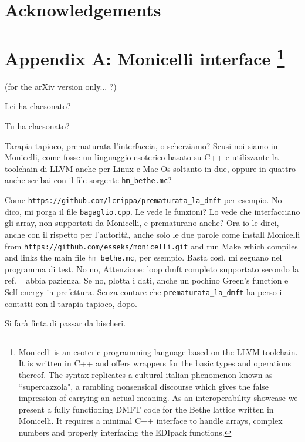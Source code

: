 \documentclass[preprint,3p,10pt]{elsarticle}
\begin{document}

\section*{Acknowledgements}

\section[appA]{Appendix A: Monicelli interface
\footnote{Monicelli is an esoteric programming language based on the LLVM toolchain. It is written in C++ and offers wrappers for the basic types and operations thereof. The syntax replicates a cultural italian phenomenon known as ``supercazzola", a rambling nonsensical discourse which gives the false impression of carrying an actual meaning. As an interoperability showcase we present a fully functioning DMFT code for the Bethe lattice written in Monicelli. It requires a minimal C++ interface to handle arrays, complex numbers and properly interfacing the EDIpack functions. }}

(for the arXiv version only... ?)

Lei ha clacsonato?

Tu ha clacsonato?

Tarapia tapioco, prematurata l'interfaccia, o scherziamo? Scusi noi siamo in Monicelli, come fosse un linguaggio esoterico basato su C++ e utilizzante la toolchain di LLVM anche per Linux e Mac Os soltanto in due, oppure in quattro anche scribai con il file sorgente {\tt hm\_bethe.mc}? 

Come {\tt https://github.com/lcrippa/prematurata\_la\_dmft} per esempio. No dico, mi porga il file {\tt bagaglio.cpp}. Le vede le funzioni? Lo vede che interfacciano gli array, non supportati da Monicelli, e prematurano anche?
Ora io le direi, anche con il rispetto per l'autorità, anche solo le due parole come install Monicelli from {\tt https://github.com/esseks/monicelli.git} and run Make which compiles and links the main file {\tt hm\_bethe.mc}, per esempio. Basta così, mi seguano nel programma di test. No no, Attenzione: loop dmft completo supportato secondo la ref. ~\cite{Georges1996RMP} abbia pazienza. Se no, plotta i dati, anche un pochino Green's function e Self-energy in prefettura. Senza contare che {\tt prematurata\_la\_dmft} ha perso i contatti con il tarapia tapioco, dopo.

Si farà finta di passar da bischeri.



\end{document}
